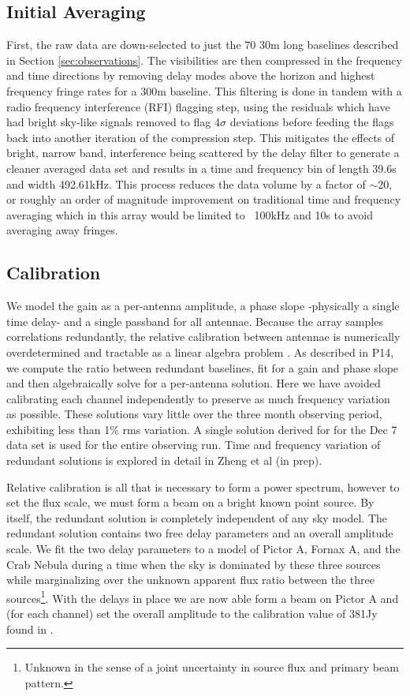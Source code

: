 \documentclass[preprint]{aastex}
\begin{document}
\subsection{Initial Averaging}
  First, the raw data are down-selected to just the 70 30m long baselines described in Section \ref{sec:observations}.  %
   The visibilities are then compressed in the frequency and time directions by removing delay modes above the horizon and highest frequency fringe rates for a 300m baseline.  This filtering is done in tandem with a radio frequency interference (RFI) flagging step, using the residuals which have had bright sky-like signals removed to flag 4$\sigma$ deviations before feeding the flags back into another iteration of the compression step. This mitigates the effects of bright, narrow band, interference  being scattered by the delay filter to generate a cleaner averaged data set and results in a time and frequency bin of length 39.6s and width 492.61kHz. 
  This process reduces the data volume by a factor of $\sim$20, or roughly an order of magnitude improvement on traditional time and frequency averaging which in this array would be limited to ~100kHz and 10s to avoid averaging away fringes.
  
\subsection{Calibration}
We model the gain as a per-antenna amplitude, a phase slope -physically a single time delay- and a single passband for all antennae.  Because the array samples correlations redundantly, the relative calibration between antennae is numerically overdetermined and tractable as a linear algebra problem \cite{Liu:2010p10391}.  As described in P14, we compute the ratio between redundant baselines, fit for a gain and phase slope and then algebraically solve for a per-antenna solution.  Here we have avoided calibrating each channel independently to preserve as much frequency variation as possible.   These solutions vary little over the three month observing period, exhibiting less than 1\% rms variation. A single solution derived for for the Dec 7 data set is used for the entire observing run. Time and frequency variation of redundant solutions is explored in detail in Zheng et al (in prep).  

Relative calibration is all that is necessary to form a power spectrum, however to set the flux scale, we must form a beam on a bright known point source.  By itself, the redundant solution is completely independent of any sky model. The redundant solution contains two free delay parameters and an overall amplitude scale. We fit the two delay parameters to a model of Pictor A, Fornax A, and the Crab Nebula during a time when the sky is dominated by these three sources while marginalizing over the unknown apparent flux ratio between the three sources\footnote{Unknown in the sense of a joint uncertainty in source flux and primary beam pattern.}. With the delays in place we are now able form a beam on Pictor A and (for each channel) set the overall amplitude to the calibration value of 381Jy found in \cite{jacobs:2013b}.
  
\end{document}
